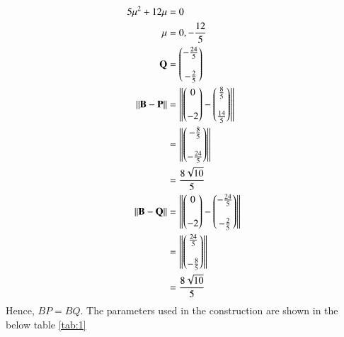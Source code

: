 \documentclass[journal,12pt,twocolumn]{IEEEtran}
\begin{document}
\begin{enumerate}
\begin{align}
5\mu^2 + 12 \mu &=0\\
\mu &= 0, -\frac{12}{5}\\
\mathbf{Q} &= \begin{pmatrix}-\frac{24}{5}\\\\-\frac{2}{5}\end{pmatrix}\\
\left\lVert\mathbf{B}-\mathbf{P}\right\rVert &= \left\lVert\begin{pmatrix}0\\\\-2\end{pmatrix} - \begin{pmatrix}\frac{8}{5}\\\\ \frac{14}{5}\end{pmatrix}\right\rVert\\
&= \left\lVert\begin{pmatrix}-\frac{8}{5}\\\\-\frac{24}{5}\end{pmatrix}\right\rVert\\
&= \frac{8\sqrt{10}}{5}\\
\left\lVert\mathbf{B}-\mathbf{Q}\right\rVert &= \left\lVert\begin{pmatrix}0\\\\-2\end{pmatrix} - \begin{pmatrix}-\frac{24}{5}\\\\-\frac{2}{5}\end{pmatrix}\right\rVert\\
&= \left\lVert\begin{pmatrix}\frac{24}{5}\\\\-\frac{8}{5}\end{pmatrix}\right\rVert\\
&= \frac{8\sqrt{10}}{5}
\end{align}
Hence, $BP = BQ$.
The parameters used in the construction are shown in the below table \ref{tab:1}

\begin{table}[h]
\centering

\caption{}
\label{tab:1}
\end{table}
\end{enumerate}
\end{document}
